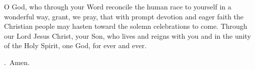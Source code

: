 \lettrine[lines=3]{O}{} God, who through your Word
reconcile the human race to yourself in a wonderful way,
grant, we pray,
that with prompt devotion and eager faith
the Christian people may hasten
toward the solemn celebrations to come.
Through our Lord Jesus Christ, your Son,
who lives and reigns with you and in the unity of the Holy Spirit,
one God, for ever and ever.
\par \Rbar.~Amen.
